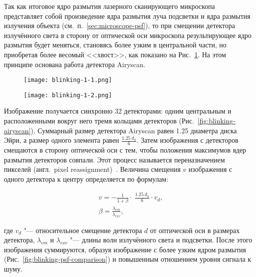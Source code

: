 Так как итоговое ядро размытия лазерного сканирующего микроскопа представляет собой произведение ядра размытия луча подсветки и ядра размытия излучения объекта (см.~п.~\ref{sec:microscope-psf}), то при смещении детектора излучённого света в сторону от оптической оси микроскопа результирующее ядро размытия будет меняться, становясь более узким в центральной части, но приобретая более весомый <<хвост>>, как показано на Рис.~\ref{fig:blinking-psf-displacement}. На этом принципе основана работа детектора Airyscan.

\begin{figure}[ht]
	\hfill
	\centering
	\begin{minipage}{0.45\textwidth}
		\centering
		\texttt{[image: blinking-1-1.png]}
		\label{fig:blinking-psf}
	\end{minipage} \hfill
	\begin{minipage}{0.45\textwidth}
		\centering
		\texttt{[image: blinking-1-2.png]}
		\label{fig:blinking-psf-displacement}
	\end{minipage}
	\hfill
\end{figure}

Изображение получается синхронно 32 детекторами: одним центральным и расположенными вокруг него тремя кольцами детекторов (Рис.~\ref{fig:blinking-airyscan}). Суммарный размер детектора Airyscan равен 1.25 диаметра диска Эйри, а размер одного элемента равен $\frac{1.25\ d_a}{6}$. Затем изображения с детекторов смещаются в сторону оптической оси с тем, чтобы положения максимумов ядер размытия детекторов совпали. Этот процесс называется переназначением пикселей (англ.~pixel reassignment)~\cite{sheppard2013superresolution}. Величина смещения $v$ изображения с одного детектора к центру определяется по формулам:

\begin{subequations}
	\begin{align}
		&v=-\frac{1}{1+\beta}\cdot\ \frac{1.25\ d_a}{6}\cdot v_d,  \nonumber \\
		&\beta=\frac{\lambda_{em}}{\lambda_{exc}},  \nonumber
	\end{align}
\end{subequations}

\noindent где $v_d$ "--- относительное смещение детектора $d$ от оптической оси в размерах детектора, $\lambda_{em}$ и $\lambda_{exc}$ "--- длины волн излучённого света и подсветки. После этого изображения суммируются, образуя изображение с более узким ядром размытия (Рис.~\ref{fig:blinking-psf-comparison}) и повышенным отношением уровня сигнала к шуму.

